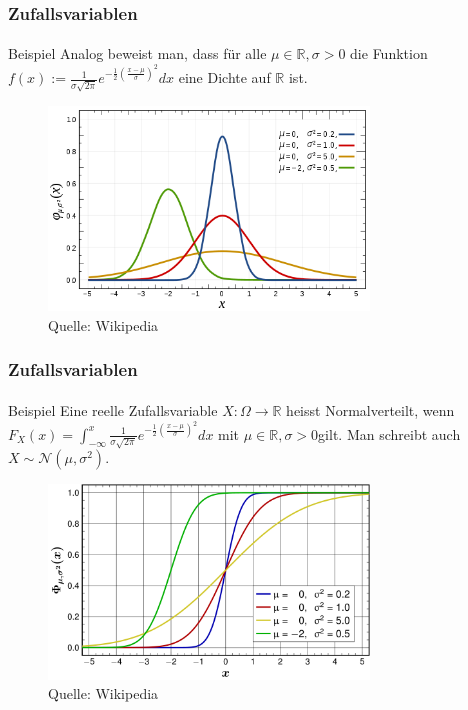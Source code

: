 \documentclass{beamer}
\begin{document}
\begin{frame}
    \frametitle{Zufallsvariablen}
\framesubtitle{}
\begin{block}{Beispiel}
Analog beweist man, dass für alle  $\mu \in \mathbb{R}, \sigma > 0 $ die Funktion $ f(x):=  \frac 1{\sigma \sqrt{2\pi}}e^{- \frac {1}{2} (\frac{x- \mu}{ \sigma})^2}dx$  eine  Dichte auf $ \mathbb{R}$ ist.
\end{block}
\begin{figure}[htp]
      \centering
    \includegraphics[width=0.76\textwidth]{img/normal}
      \caption{Quelle: Wikipedia}
\end{figure}
 \end{frame}

\begin{frame}
    \frametitle{Zufallsvariablen}
\framesubtitle{}
\begin{block}{Beispiel}
Eine reelle Zufallsvariable $X: \Omega \to \mathbb{R}$ heisst Normalverteilt, wenn 
$F_X (x) = \int_{- \infty}^{x}  \frac 1{\sigma \sqrt{2\pi}}e^{- \frac {1}{2} (\frac{x- \mu}{ \sigma})^2}dx$ mit  $\mu \in \mathbb{R}, \sigma > 0 $gilt. Man schreibt auch $X \sim \mathcal{N}(\mu, \sigma^2)$.
\end{block}
\begin{figure}[htp]
      \centering
    \includegraphics[width=0.76\textwidth]{img/normaldist}
      \caption{Quelle: Wikipedia}
\end{figure}
 \end{frame}
\end{document}
